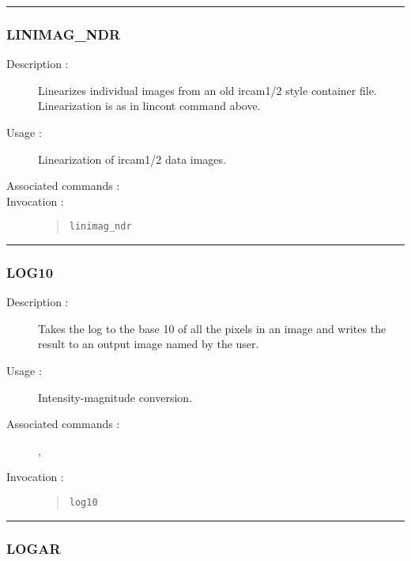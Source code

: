 \hrule 
\subsubsection*{\label{LINIMAG_NDR}LINIMAG\_NDR}

\begin{description}

\item[Description :] Linearizes individual images from an old {\sc ircam1/2} 
style container file.  Linearization is as in lincont command above.

\item[Usage :] Linearization of {\sc ircam1/2} data images.

\item[Associated commands :] {\tt {}}

\item[Invocation :]

\begin{quote}{\tt  linimag\_ndr }\end{quote}

\end{description}

\hrule 
\subsubsection*{\label{LOG10}LOG10}

\begin{description}

\item[Description :] Takes the log to the base 10 of all the pixels in
an image and writes the result to an output image named by the user.

\item[Usage :] Intensity-magnitude conversion.
\item[Associated commands :] {\tt {}}, 
{\tt {}}
\item[Invocation :]

\begin{quote}{\tt  log10 }\end{quote}

\end{description}

\hrule 
\subsubsection*{\label{LOGAR}LOGAR}

